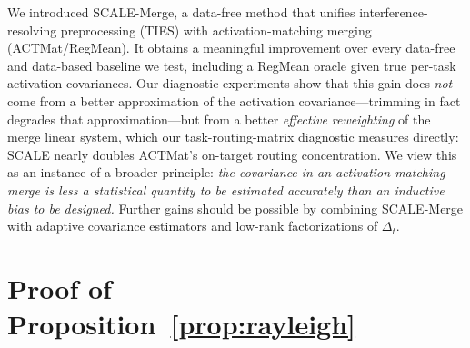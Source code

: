 \documentclass{article} %
\begin{document}
We introduced SCALE-Merge, a data-free method that unifies interference-resolving preprocessing (TIES) with activation-matching merging (ACTMat/RegMean). It obtains a meaningful improvement over every data-free and data-based baseline we test, including a RegMean oracle given true per-task activation covariances. Our diagnostic experiments show that this gain does \emph{not} come from a better approximation of the activation covariance---trimming in fact degrades that approximation---but from a better \emph{effective reweighting} of the merge linear system, which our task-routing-matrix diagnostic measures directly: SCALE nearly doubles ACTMat's on-target routing concentration. We view this as an instance of a broader principle: \emph{the covariance in an activation-matching merge is less a statistical quantity to be estimated accurately than an inductive bias to be designed.} Further gains should be possible by combining SCALE-Merge with adaptive covariance estimators \citep{aceemrging2026} and low-rank factorizations of $\Delta_t$.




\newpage
\appendix

\section{Proof of Proposition~\ref{prop:rayleigh}}
\label{app:proof}
\end{document}
